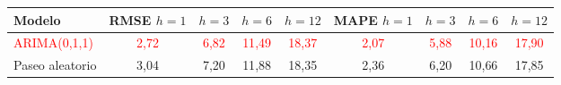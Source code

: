 \begin{tabular}{lcccccccc}
\toprule
Modelo & RMSE $h{=}1$ & $h{=}3$ & $h{=}6$ & $h{=}12$ & MAPE $h{=}1$ & $h{=}3$ & $h{=}6$ & $h{=}12$
\\ \midrule
\textcolor{red}{ARIMA(0,1,1)} & \textcolor{red}{2{,}72} & \textcolor{red}{6{,}82} & \textcolor{red}{11{,}49} & \textcolor{red}{18{,}37} & \textcolor{red}{2{,}07} & \textcolor{red}{5{,}88} & \textcolor{red}{10{,}16} & \textcolor{red}{17{,}90} \\
Paseo aleatorio & 3{,}04 & 7{,}20 & 11{,}88 & 18{,}35 & 2{,}36 & 6{,}20 & 10{,}66 & 17{,}85 \\
\bottomrule
\end{tabular}
